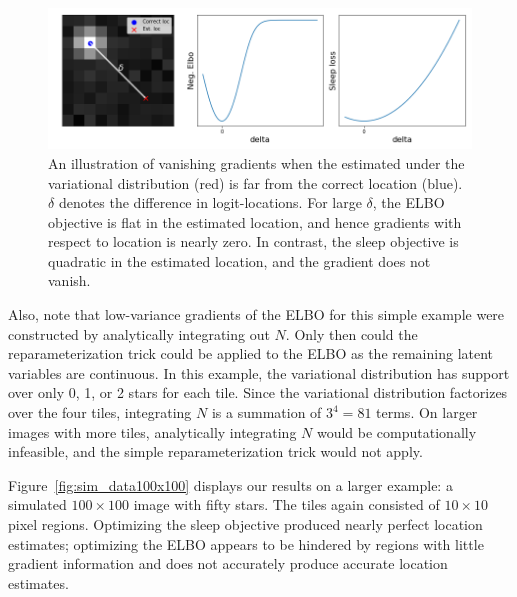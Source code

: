 \begin{figure}[!htb]
    \centering
    \includegraphics[width=\textwidth]{figures/gradzero_cartoon3.png}
    \caption{An illustration of vanishing gradients when the estimated under the variational distribution (red) is far from the correct location (blue). 
    $\delta$ denotes the difference in logit-locations. 
    For large $\delta$, the ELBO objective is flat in the estimated location, and hence gradients with respect to location is nearly zero.
    In contrast, the sleep objective is quadratic in the estimated location, and the gradient does not vanish. }
    \label{fig:gradzero_cartoon}
\end{figure}

Also, note that low-variance gradients of the ELBO for this simple example were constructed by analytically integrating out $N$. Only then could the reparameterization trick could be applied to the ELBO as the remaining latent variables are continuous. 
In this example, the variational distribution has support over only 0, 1, or 2 stars for each tile. 
Since the variational distribution factorizes over the four tiles, integrating $N$ is a summation of $3^4 = 81$ terms.
On larger images with more tiles, analytically integrating $N$ would be computationally infeasible, 
and the simple reparameterization trick would not apply. 

Figure~\ref{fig:sim_data100x100} displays our results on a larger example: a simulated $100\times 100$ image with fifty stars. 
The tiles again consisted of $10\times 10$ pixel regions. 
Optimizing the sleep objective produced nearly perfect location estimates; 
optimizing the ELBO appears to be hindered by regions with little gradient information and does not accurately produce accurate location estimates. 

